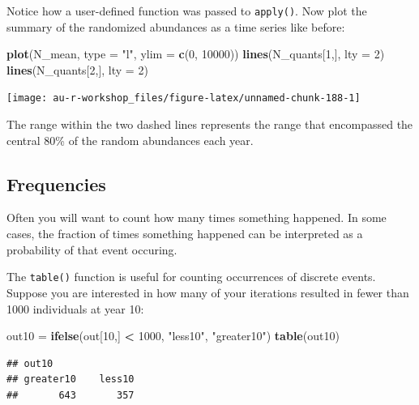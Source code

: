 \documentclass[]{book}
\newenvironment{Shaded}{\begin{snugshade}}{\end{snugshade}}
\newcommand{\KeywordTok}[1]{\textcolor[rgb]{0.13,0.29,0.53}{\textbf{#1}}}
\newcommand{\DataTypeTok}[1]{\textcolor[rgb]{0.13,0.29,0.53}{#1}}
\newcommand{\DecValTok}[1]{\textcolor[rgb]{0.00,0.00,0.81}{#1}}
\newcommand{\StringTok}[1]{\textcolor[rgb]{0.31,0.60,0.02}{#1}}
\newcommand{\OperatorTok}[1]{\textcolor[rgb]{0.81,0.36,0.00}{\textbf{#1}}}
\newcommand{\NormalTok}[1]{#1}
\theoremstyle{definition}
\theoremstyle{definition}
\theoremstyle{definition}
\theoremstyle{remark}
\begin{document}
Notice how a user-defined function was passed to \texttt{apply()}. Now
plot the summary of the randomized abundances as a time series like
before:

\begin{Shaded}
\begin{Highlighting}[]
\KeywordTok{plot}\NormalTok{(N_mean, }\DataTypeTok{type =} \StringTok{"l"}\NormalTok{, }\DataTypeTok{ylim =} \KeywordTok{c}\NormalTok{(}\DecValTok{0}\NormalTok{, }\DecValTok{10000}\NormalTok{))}
\KeywordTok{lines}\NormalTok{(N_quants[}\DecValTok{1}\NormalTok{,], }\DataTypeTok{lty =} \DecValTok{2}\NormalTok{)}
\KeywordTok{lines}\NormalTok{(N_quants[}\DecValTok{2}\NormalTok{,], }\DataTypeTok{lty =} \DecValTok{2}\NormalTok{)}
\end{Highlighting}
\end{Shaded}

\begin{center}\texttt{[image: au-r-workshop\_files/figure-latex/unnamed-chunk-188-1]} \end{center}

The range within the two dashed lines represents the range that
encompassed the central 80\% of the random abundances each year.

\subsection{Frequencies}\label{frequencies}

Often you will want to count how many times something happened. In some
cases, the fraction of times something happened can be interpreted as a
probability of that event occuring.

The \texttt{table()} function is useful for counting occurrences of
discrete events. Suppose you are interested in how many of your
iterations resulted in fewer than 1000 individuals at year 10:

\begin{Shaded}
\begin{Highlighting}[]
\NormalTok{out10 =}\StringTok{ }\KeywordTok{ifelse}\NormalTok{(out[}\DecValTok{10}\NormalTok{,] }\OperatorTok{<}\StringTok{ }\DecValTok{1000}\NormalTok{, }\StringTok{"less10"}\NormalTok{, }\StringTok{"greater10"}\NormalTok{)}
\KeywordTok{table}\NormalTok{(out10)}
\end{Highlighting}
\end{Shaded}

\begin{verbatim}
## out10
## greater10    less10 
##       643       357
\end{verbatim}
\end{document}
